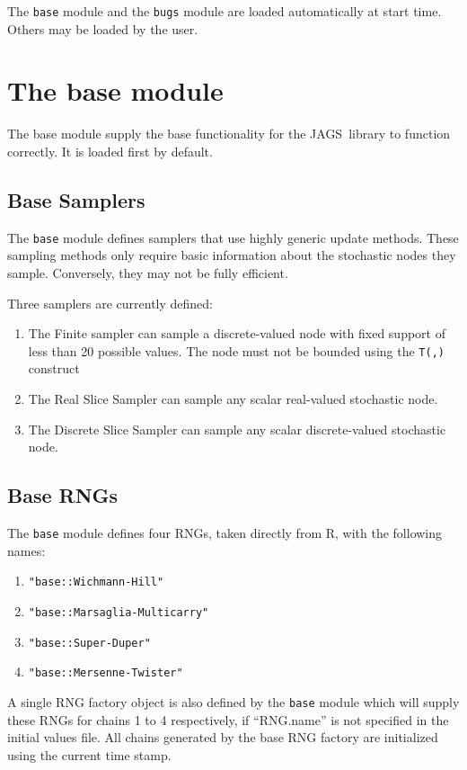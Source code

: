 \documentclass[11pt, a4paper, titlepage]{report}
\newcommand{\JAGS}{\textsf{JAGS}}
\newcommand{\R}{\textsf{R}}
\begin{document}
The \verb+base+ module and the \verb+bugs+ module are loaded automatically
at start time.  Others may be loaded by the user.

\section{The base module}

The base module supply the base functionality for the \JAGS\ library
to function correctly. It is loaded first by default.  

\subsection{Base Samplers}

The \verb+base+ module defines samplers that use highly generic update
methods.  These sampling methods only require basic information about
the stochastic nodes they sample.  Conversely, they may not be fully
efficient.

Three samplers are currently defined:
\begin{enumerate}
\item The Finite sampler can sample a discrete-valued node with
fixed support of less than 20 possible values. The node must not
be bounded using the \verb+T(,)+ construct
\item The Real Slice Sampler can sample any scalar real-valued 
stochastic node.
\item The Discrete Slice Sampler can sample any scalar
discrete-valued stochastic node.
\end{enumerate}

\subsection{Base RNGs}

The \verb+base+ module defines four RNGs, taken directly from \R,
with the following names:
\begin{enumerate}
\item \verb+"base::Wichmann-Hill"+
\item \verb+"base::Marsaglia-Multicarry"+
\item \verb+"base::Super-Duper"+
\item \verb+"base::Mersenne-Twister"+
\end{enumerate}

A single RNG factory object is also defined by the \verb+base+
module which will supply these RNGs for chains 1 to 4 respectively, if
``RNG.name'' is not specified in the initial values file.  All chains
generated by the base RNG factory are initialized using the current
time stamp.
\end{document}
